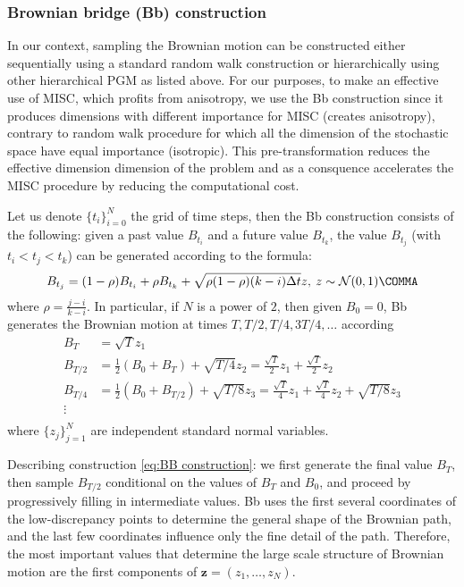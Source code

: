 \subsubsection{Brownian bridge (Bb) construction}\label{sec:Brwonian bridge construction}
In our context, sampling the Brownian motion can be constructed either sequentially using a standard random walk construction or hierarchically using   other hierarchical PGM as listed above. For our purposes, to make an effective use of MISC, which profits from anisotropy, we use the Bb construction since it produces  dimensions with different importance for MISC (creates anisotropy), contrary to random walk procedure for which all the dimension of the stochastic space have equal importance (isotropic).  This pre-transformation  reduces the effective dimension dimension  of the problem and as a consquence accelerates the MISC procedure by reducing the computational cost.

Let us denote $\{t_i\}_{i=0}^{N}$ the grid of time steps, then the Bb construction \cite{glasserman2004monte} consists of the following: given a past value $B_{t_i}$ and a future value $B_{t_k}$, the value $B_{t_j}$ (with $t_i < t_j < t_k$) can be generated according to the formula:
\begin{equation}
B_{t_j}=(1-\rho) B_{t_i}+\rho B_{t_k}+ \sqrt{\rho (1-\rho)(k-i) \Delta t} z, \: z \sim \mathcal{N}(0,1) \COMMA
\end{equation}
where $\rho=\frac{j-i}{k-i}$.  In particular, if $N$ is a power of $2$, then given $B_0=0$, Bb generates the Brownian motion at times $T, T/2,T/4,3T/4,\dots$ according
\begin{align}\label{eq:BB construction}
	B_T&=\sqrt{T}z_1\nonumber\\
	B_{T/2}&= \frac{1}{2}(B_{0}+B_{T})+\sqrt{T/4}z_2= \frac{\sqrt{T}}{2} z_1+\frac{\sqrt{T}}{2} z_2\nonumber\\
	B_{T/4}&=\frac{1}{2} (B_{0}+B_{T/2})+\sqrt{T/8}z_3= \frac{\sqrt{T}}{4} z_1+\frac{\sqrt{T}}{4} z_2+\sqrt{T/8}z_3\nonumber\\
	\vdots \nonumber\\
\end{align}
where $\{z_j\}_{j=1}^{N}$ are independent standard normal variables. 

Describing construction \ref{eq:BB construction}: we  first generate the final value $B_T$, then sample $B_{T/2}$ conditional
on the values of $B_T$ and $B_0$, and proceed by progressively filling in intermediate values. Bb uses the first several coordinates of the low-discrepancy points to determine the general shape of the Brownian path, and the last few coordinates influence only the fine detail of the path. Therefore, the most important values that determine the large scale structure of Brownian motion are the first components of $\mathbf{z} = (z_1,\dots,z_N)$.  

